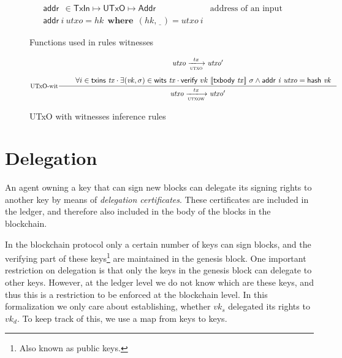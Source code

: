 \documentclass[11pt,a4paper]{article}
\newcommand{\powerset}[1]{\mathbb{P}~#1}
\newcommand{\var}[1]{\mathit{#1}}
\newcommand{\fun}[1]{\mathsf{#1}}
\newcommand{\type}[1]{\mathsf{#1}}
\newcommand{\trans}[2]{\xlongrightarrow[\textsc{#1}]{#2}}
\newcommand{\where}{~ ~ \mathbf{where}~ ~ }
\newcommand{\Tx}{\type{Tx}}
\newcommand{\Addr}{\type{Addr}}
\newcommand{\UTxO}{\type{UTxO}}
\newcommand{\TxIn}{\type{TxIn}}
\newcommand{\txins}[1]{\fun{txins}~ \var{#1}}
\newcommand{\wits}[1]{\fun{wits}~ \var{#1}}
\newcommand{\verify}[3]{\fun{verify} ~ #1 ~ #2 ~ #3}
\newcommand{\serialised}[1]{\llbracket \var{#1} \rrbracket}
\newcommand{\addr}[2]{\fun{addr}~ \var{#1}~ \var{#2}}
\newcommand{\hash}[1]{\fun{hash}~ \var{#1}}
\newcommand{\txbody}[1]{\fun{txbody}~ \var{#1}}
\newcommand{\wcard}[0]{\underline{\phantom{a}}}
\begin{document}
\begin{figure}
  \begin{align*}
    & \addr{}{} \in \TxIn \mapsto \UTxO \mapsto \Addr & \text{address of an input}\\
    & \addr{i}{utxo} = \var{hk} \where (hk, \wcard) = \var{utxo}~i
  \end{align*}
  \caption{Functions used in rules witnesses}
  \label{fig:witnesses-ops}
\end{figure}


\begin{figure}
  \begin{equation}
    \label{eq:utxo-witness-inductive}
    \inference[UTxO-wit]
    { \var{utxo} \trans{utxo}{tx} \var{utxo'}\\ ~ \\
      & \forall i \in \txins{tx} \cdot
           \exists (\var{vk}, \sigma) \in \wits{\var{tx}} \cdot
              \verify{vk}{\serialised{\txbody{tx}}}{\sigma} \wedge \addr{i}{utxo} = \hash{vk}
    }
    {\var{utxo} \trans{utxow}{tx} \var{utxo'}}
  \end{equation}
  \caption{UTxO with witnesses inference rules}
  \label{fig:rules-utxo-witnesses}
\end{figure}

\section{Delegation}
\label{sec:delegation}

An agent owning a key that can sign new blocks can delegate its signing rights
to another key by means of \textit{delegation certificates}. These certificates
are included in the ledger, and therefore also included in the body of the
blocks in the blockchain.

In the blockchain protocol only a certain number of keys can sign blocks, and
the verifying part of these keys\footnote{Also known as public keys.} are
maintained in the genesis block. One important restriction on delegation is
that only the keys in the genesis block can delegate to other keys. However, at
the ledger level we do not know which are these keys, and thus this is a
restriction to be enforced at the blockchain level. In this formalization we
only care about establishing, whether $\var{vk}_s$ delegated its rights to
$\var{vk}_d$. To keep track of this, we use a map from keys to keys.
\end{document}

